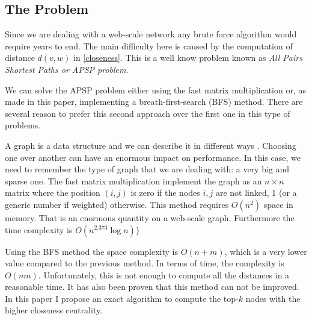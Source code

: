 \clearpage
\subsection{The Problem}

Since we are dealing with a web-scale network any brute force algorithm would require years to end. The main difficulty here is caused by the computation of distance $d(v,w)$ in \eqref{closeness}. This is a well know problem known as \emph{All Pairs Shortest Paths or APSP problem}. \s

\noindent We can solve the APSP problem either using the fast matrix multiplication or, as made in this paper, implementing a breath-first-search (BFS) method. There are several reason to prefer this second approach over the first one in this type of problems. \s

\noindent A graph is a data structure and we can describe it in different ways \cite{skienna08}. Choosing one over another can have an enormous impact on performance. In this case, we need to remember the type of graph that we are dealing with: a very big and sparse one. The fast matrix multiplication implement the graph as an $n\times n$ matrix where the position $(i,j)$ is zero if the nodes $i,j$ are not linked, 1 (or a generic number if weighted) otherwise. This method requires $O(n^2)$ space in memory. That is an enormous quantity on a web-scale graph. Furthermore the time complexity is $O(n^{2.373} \log n)\}$ \cite{10.1145/567112.567114}  \s

\noindent Using the BFS method the space complexity is $O(n+m)$, which is a very lower value compared to the previous method. In terms of time, the complexity is $O(nm)$. Unfortunately, this is not enough to compute all the distances in a reasonable time. It has also been proven that this method can not be improved. In this paper I propose an exact algorithm to compute the top-$k$ nodes with the higher closeness centrality.
